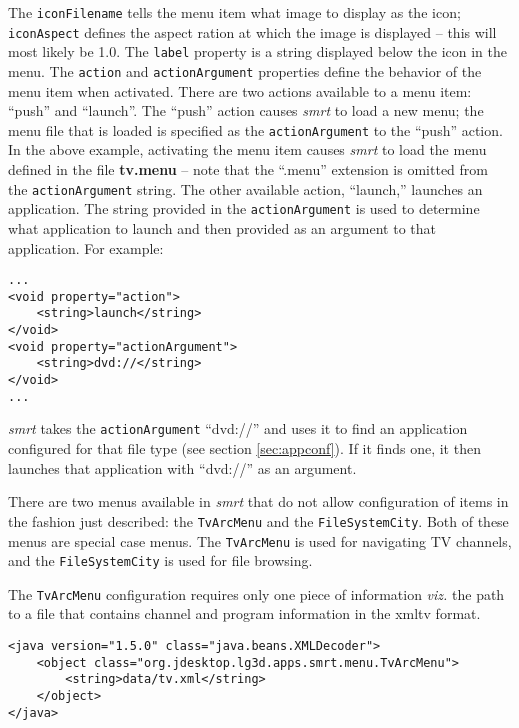 \documentclass[letterpaper, titlepage, 11pt]{article}
\begin{document}
The \texttt{iconFilename} tells the menu item what image to display as the icon;
\texttt{iconAspect} defines the aspect ration at which the image is displayed --
this will most likely be 1.0.  The \texttt{label} property is a string displayed
below the icon in the menu.  The \texttt{action} and \texttt{actionArgument}
properties define the behavior of the menu item when activated.  There are two
actions available to a menu item: ``push'' and ``launch''.  The ``push'' action
causes \textit{smrt} to load a new menu; the menu file that is loaded is
specified as the \texttt{actionArgument} to the ``push'' action.  In the above
example, activating the menu item causes \textit{smrt} to load the menu defined
in the file \textbf{tv.menu} -- note that the ``.menu'' extension is omitted
from the \texttt{actionArgument} string.  The other available action,
``launch,'' launches an application.  The string provided in the
\texttt{actionArgument} is used to determine what application to launch and then
provided as an argument to that application.  For example:

\begin{verbatim}
...
<void property="action">
    <string>launch</string>
</void>
<void property="actionArgument">
    <string>dvd://</string>
</void>
...
\end{verbatim}

\textit{smrt} takes the \texttt{actionArgument} ``dvd://'' and
uses it to find an application configured for that file type (see section
\ref{sec:appconf}).  If it finds one, it then launches that application with
``dvd://'' as an argument.

There are two menus available in \textit{smrt} that do not allow configuration
of items in the fashion just described: the \texttt{TvArcMenu} and the
\texttt{FileSystemCity}.  Both of these menus are special case menus.  The
\texttt{TvArcMenu} is used for navigating TV channels, and the
\texttt{FileSystemCity} is used for file browsing.

The \texttt{TvArcMenu} configuration requires only one piece of information
\textit{viz.} the path to a file that contains channel and program information
in the xmltv format.

\begin{verbatim}
<java version="1.5.0" class="java.beans.XMLDecoder">
    <object class="org.jdesktop.lg3d.apps.smrt.menu.TvArcMenu">
        <string>data/tv.xml</string>
    </object>
</java>
\end{verbatim}
\end{document}
